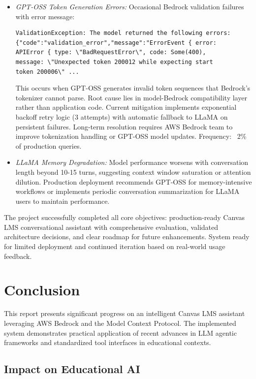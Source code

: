 \documentclass{article}
\begin{document}
\begin{itemize}
    \item \textit{GPT-OSS Token Generation Errors:} Occasional Bedrock validation failures with error message:
    \begin{verbatim}
ValidationException: The model returned the following errors:
{"code":"validation_error","message":"ErrorEvent { error:
APIError { type: \"BadRequestError\", code: Some(400),
message: \"Unexpected token 200012 while expecting start
token 200006\" ...
    \end{verbatim}
    This occurs when GPT-OSS generates invalid token sequences that Bedrock's tokenizer cannot parse. Root cause lies in model-Bedrock compatibility layer rather than application code. Current mitigation implements exponential backoff retry logic (3 attempts) with automatic fallback to LLaMA on persistent failures. Long-term resolution requires AWS Bedrock team to improve tokenization handling or GPT-OSS model updates. Frequency: ~2\% of production queries.
    
    \item \textit{LLaMA Memory Degradation:} Model performance worsens with conversation length beyond 10-15 turns, suggesting context window saturation or attention dilution. Production deployment recommends GPT-OSS for memory-intensive workflows or implements periodic conversation summarization for LLaMA users to maintain performance.
    
\end{itemize}

The project successfully completed all core objectives: production-ready Canvas LMS conversational assistant with comprehensive evaluation, validated architecture decisions, and clear roadmap for future enhancements. System ready for limited deployment and continued iteration based on real-world usage feedback.


\section{Conclusion}

This report presents significant progress on an intelligent Canvas LMS assistant leveraging AWS Bedrock and the Model Context Protocol. The implemented system demonstrates practical application of recent advances in LLM agentic frameworks \cite{wang2025megaagent, chen2024llmma} and standardized tool interfaces \cite{mcp2025landscape} in educational contexts.

\subsection{Impact on Educational AI}
\end{document}

